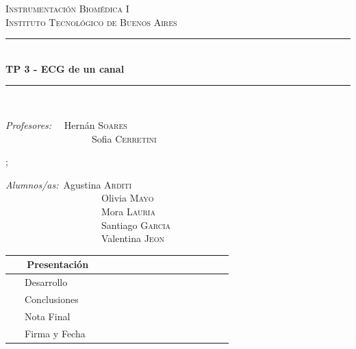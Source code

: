 \documentclass[10pt]{article}
\newcommand{\HRule}{\rule{\linewidth}{0.5mm}}
\begin{document}
\begin{center}


\textsc{\LARGE Instrumentación Biomédica I}\\[0.2cm]
\textsc{\Large Instituto Tecnológico de Buenos Aires}\\[0.2cm]

\HRule\\[0.2cm]
{ \huge \bfseries  TP 3 - ECG de un canal \\[0.2cm] }
\HRule\\[1cm]

\begin{multicols}{2}

{\raggedright{}
\large
\emph{Profesores:} \ \  Hernán   \textsc{Soares}\\

\ \ \ \ \ \ \ \ \ \ \ \ \ \ \ \ \ \  Sofia \textsc{Cerretini} \\
}

\columnbreak;
{\raggedright{}
\large
\emph{Alumnos/as:}\  Agustina  \textsc{Arditi} \\
\ \ \ \ \ \ \ \ \ \ \ \ \ \ \ \ \ \ \ \ Olivia  \textsc{Mayo}\\
\  \ \ \ \ \ \ \ \ \ \ \ \ \ \ \ \ \ \ \ Mora  \textsc{Lauria}\\
\ \ \ \ \ \ \ \ \ \ \ \ \ \ \ \ \ \ \ \ Santiago \textsc{Garcia} \\
\ \ \ \ \ \ \ \ \ \ \ \ \ \ \ \ \ \ \ \ Valentina \textsc{Jeon} \\
}
\end{multicols}

\vspace{0.5cm}

\begin{adjustbox}{max width=\textwidth}

\tabulinesep=1.8mm

  \begin{tabu}{|  l | c |}
    \hline
     \ \ \ Presentación  &       \ \ \  \ \ \  \ \ \   \ \ \ \ \ \  \\ \hline
     \ \ \ Desarrollo &  \\ \hline
     \ \ \ Conclusiones &   \\ \hline
    \ \ \  Nota Final &  \\ \hline \hline
     \ \ \  Firma y Fecha  \ \ \ \ \ \ \ \ \ &   \\
    \hline
  \end{tabu}
\end{adjustbox}

\end{center}
\end{document}

